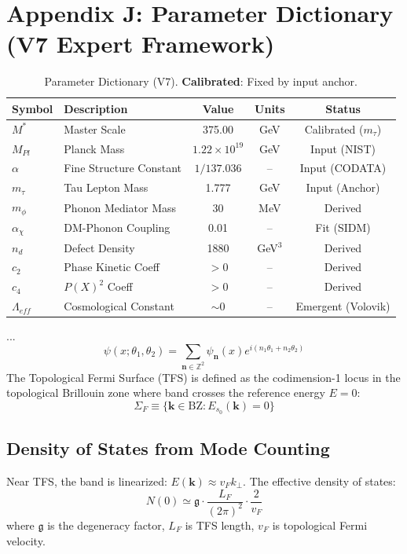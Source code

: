 \documentclass[a4paper,12pt]{article}
\begin{document}
\section{Appendix J: Parameter Dictionary (V7 Expert Framework)}
\begin{table}[H]
\centering
\small
\begin{tabular}{llccc}
\toprule
\textbf{Symbol} & \textbf{Description} & \textbf{Value} & \textbf{Units} & \textbf{Status} \\
\midrule
$M^*$ & Master Scale & 375.00 & GeV & Calibrated ($m_\tau$) \\
$M_{Pl}$ & Planck Mass & $1.22 \times 10^{19}$ & GeV & Input (NIST) \\
$\alpha$ & Fine Structure Constant & $1/137.036$ & -- & Input (CODATA) \\
$m_\tau$ & Tau Lepton Mass & 1.777 & GeV & Input (Anchor) \\
$m_\phi$ & Phonon Mediator Mass & 30 & MeV & Derived \\
$\alpha_\chi$ & DM-Phonon Coupling & 0.01 & -- & Fit (SIDM) \\
$n_d$ & Defect Density & 1880 & GeV$^3$ & Derived \\
$c_2$ & Phase Kinetic Coeff & $> 0$ & -- & Derived \\
$c_4$ & $P(X)^2$ Coeff & $> 0$ & -- & Derived \\
$\Lambda_{eff}$ & Cosmological Constant & $\sim 0$ & -- & Emergent (Volovik) \\
\bottomrule
\end{tabular}
\caption{Parameter Dictionary (V7). \textbf{Calibrated}: Fixed by input anchor.}
\end{table}
...
\begin{equation}
 \psi(x; \theta_1, \theta_2) = \sum_{\mathbf{n} \in \mathbb{Z}^2} \psi_{\mathbf{n}}(x) e^{i(n_1\theta_1 + n_2\theta_2)}
\end{equation}
The Topological Fermi Surface (TFS) is defined as the codimension-1 locus in the topological Brillouin zone where band crosses the reference energy $E=0$:
\begin{equation}
 \Sigma_F \equiv \{ \mathbf{k} \in \text{BZ} : E_{s_0}(\mathbf{k}) = 0 \}
\end{equation}

\subsection{Density of States from Mode Counting}
Near TFS, the band is linearized: $E(\mathbf{k}) \approx v_F k_\perp$. The effective density of states:
\begin{equation}
 N(0) \simeq \mathfrak{g} \cdot \frac{L_F}{(2\pi)^2} \cdot \frac{2}{v_F}
\end{equation}
where $\mathfrak{g}$ is the degeneracy factor, $L_F$ is TFS length, $v_F$ is topological Fermi velocity.
\end{document}
